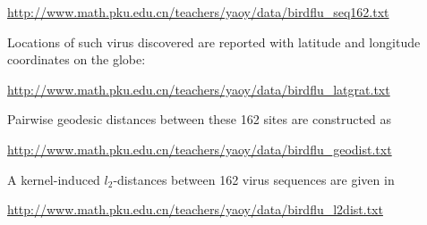 \documentclass[11pt]{article}
\begin{document}
\url{http://www.math.pku.edu.cn/teachers/yaoy/data/birdflu_seq162.txt} 

Locations of such virus discovered are reported with latitude and longitude coordinates on the globe:

\url{http://www.math.pku.edu.cn/teachers/yaoy/data/birdflu_latgrat.txt} 

Pairwise geodesic distances between these 162 sites are constructed as  

\url{http://www.math.pku.edu.cn/teachers/yaoy/data/birdflu_geodist.txt}

A kernel-induced $l_2$-distances between 162 virus sequences are given in 

\url{http://www.math.pku.edu.cn/teachers/yaoy/data/birdflu_l2dist.txt}
\end{document}
